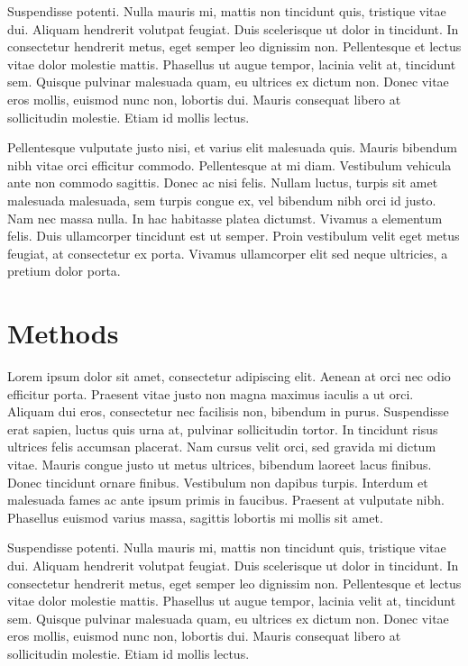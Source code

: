\documentclass[12pt,]{article}
\begin{document}
Suspendisse potenti. Nulla mauris mi, mattis non tincidunt quis,
tristique vitae dui. Aliquam hendrerit volutpat feugiat. Duis
scelerisque ut dolor in tincidunt. In consectetur hendrerit metus, eget
semper leo dignissim non. Pellentesque et lectus vitae dolor molestie
mattis. Phasellus ut augue tempor, lacinia velit at, tincidunt sem.
Quisque pulvinar malesuada quam, eu ultrices ex dictum non. Donec vitae
eros mollis, euismod nunc non, lobortis dui. Mauris consequat libero at
sollicitudin molestie. Etiam id mollis lectus.

Pellentesque vulputate justo nisi, et varius elit malesuada quis. Mauris
bibendum nibh vitae orci efficitur commodo. Pellentesque at mi diam.
Vestibulum vehicula ante non commodo sagittis. Donec ac nisi felis.
Nullam luctus, turpis sit amet malesuada malesuada, sem turpis congue
ex, vel bibendum nibh orci id justo. Nam nec massa nulla. In hac
habitasse platea dictumst. Vivamus a elementum felis. Duis ullamcorper
tincidunt est ut semper. Proin vestibulum velit eget metus feugiat, at
consectetur ex porta. Vivamus ullamcorper elit sed neque ultricies, a
pretium dolor porta.

\section{Methods}\label{methods}

Lorem ipsum dolor sit amet, consectetur adipiscing elit. Aenean at orci
nec odio efficitur porta. Praesent vitae justo non magna maximus iaculis
a ut orci. Aliquam dui eros, consectetur nec facilisis non, bibendum in
purus. Suspendisse erat sapien, luctus quis urna at, pulvinar
sollicitudin tortor. In tincidunt risus ultrices felis accumsan
placerat. Nam cursus velit orci, sed gravida mi dictum vitae. Mauris
congue justo ut metus ultrices, bibendum laoreet lacus finibus. Donec
tincidunt ornare finibus. Vestibulum non dapibus turpis. Interdum et
malesuada fames ac ante ipsum primis in faucibus. Praesent at vulputate
nibh. Phasellus euismod varius massa, sagittis lobortis mi mollis sit
amet.

Suspendisse potenti. Nulla mauris mi, mattis non tincidunt quis,
tristique vitae dui. Aliquam hendrerit volutpat feugiat. Duis
scelerisque ut dolor in tincidunt. In consectetur hendrerit metus, eget
semper leo dignissim non. Pellentesque et lectus vitae dolor molestie
mattis. Phasellus ut augue tempor, lacinia velit at, tincidunt sem.
Quisque pulvinar malesuada quam, eu ultrices ex dictum non. Donec vitae
eros mollis, euismod nunc non, lobortis dui. Mauris consequat libero at
sollicitudin molestie. Etiam id mollis lectus.
\end{document}
